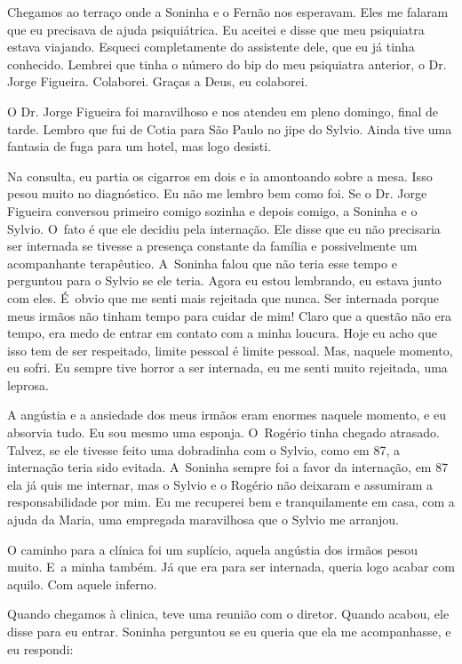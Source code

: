 Chegamos ao terraço onde a Soninha e o Fernão nos esperavam. Eles me
falaram que eu precisava de ajuda psiquiátrica. Eu aceitei e disse que
meu psiquiatra estava viajando. Esqueci completamente do assistente
dele, que eu já tinha conhecido. Lembrei que tinha o número do bip do
meu psiquiatra anterior, o Dr. Jorge Figueira. Colaborei. Graças a Deus,
eu colaborei.

O Dr. Jorge Figueira foi maravilhoso e nos atendeu em pleno domingo,
final de tarde. Lembro que fui de Cotia para São Paulo no jipe do
Sylvio. Ainda tive uma fantasia de fuga para um hotel, mas logo desisti.

Na consulta, eu partia os cigarros em dois e ia amontoando sobre a mesa.
Isso pesou muito no diagnóstico. Eu não me lembro bem como foi. Se o Dr.
Jorge Figueira conversou primeiro comigo sozinha e depois comigo, a
Soninha e o Sylvio. O~fato é que ele decidiu pela internação. Ele disse
que eu não precisaria ser internada se tivesse a presença constante da
família e possivelmente um acompanhante terapêutico. A~Soninha falou que
não teria esse tempo e perguntou para o Sylvio se ele teria. Agora eu
estou lembrando, eu estava junto com eles. É~obvio que me senti mais
rejeitada que nunca. Ser internada porque meus irmãos não tinham tempo
para cuidar de mim! Claro que a questão não era tempo, era medo de
entrar em contato com a minha loucura. Hoje eu acho que isso tem de ser
respeitado, limite pessoal é limite pessoal. Mas, naquele momento, eu
sofri. Eu sempre tive horror a ser internada, eu me senti muito
rejeitada, uma leprosa.

A angústia e a ansiedade dos meus irmãos eram enormes naquele momento, e
eu absorvia tudo. Eu sou mesmo uma esponja. O~Rogério tinha chegado
atrasado. Talvez, se ele tivesse feito uma dobradinha com o Sylvio, como
em 87, a internação teria sido evitada. A~Soninha sempre foi a favor da
internação, em 87 ela já quis me internar, mas o Sylvio e o Rogério não
deixaram e assumiram a responsabilidade por mim. Eu me recuperei bem e
tranquilamente em casa, com a ajuda da Maria, uma empregada maravilhosa
que o Sylvio me arranjou.

O caminho para a clínica foi um suplício, aquela angústia dos irmãos
pesou muito. E~a minha também. Já que era para ser internada, queria
logo acabar com aquilo. Com aquele inferno.

Quando chegamos à clinica, teve uma reunião com o diretor. Quando
acabou, ele disse para eu entrar. Soninha perguntou se eu queria que ela
me acompanhasse, e eu respondi:

